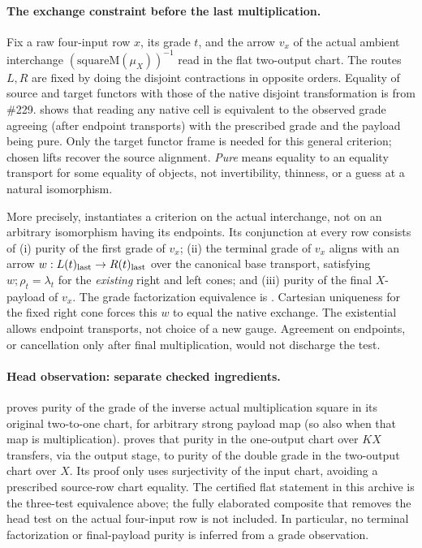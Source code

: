 \documentclass[10pt]{article}
\begin{document}
\paragraph{The exchange constraint before the last multiplication.}
Fix a raw four-input row $x$, its grade $t$, and the arrow $v_x$ of the actual ambient interchange $(\mathrm{squareM}(\mu_X))^{-1}$ read in the flat two-output chart. The routes $L,R$ are fixed by doing the disjoint contractions in opposite orders. Equality of source and target functors with those of the native disjoint transformation is from \#229.  shows that reading any native cell is equivalent to the observed grade agreeing (after endpoint transports) with the prescribed grade and the payload being pure. Only the target functor frame is needed for this general criterion; chosen lifts recover the source alignment. \emph{Pure} means equality to an equality transport for some equality of objects, not invertibility, thinness, or a guess at a natural isomorphism.
\par More precisely,  instantiates a criterion on the actual interchange, not on an arbitrary isomorphism having its endpoints. Its conjunction at every row consists of (i) purity of the first grade of $v_x$; (ii) the terminal grade of $v_x$ aligns with an arrow $w:L(t)_{\rm last}\to R(t)_{\rm last}$ over the canonical base transport, satisfying $w;\rho_t=\lambda_t$ for the \emph{existing} right and left cones; and (iii) purity of the final $X$-payload of $v_x$. The grade factorization equivalence is . Cartesian uniqueness for the fixed right cone forces this $w$ to equal the native exchange. The existential allows endpoint transports, not choice of a new gauge. Agreement on endpoints, or cancellation only after final multiplication, would not discharge the test.

\paragraph{Head observation: separate checked ingredients.}
 proves purity of the grade of the inverse actual multiplication square in its original two-to-one chart, for arbitrary strong payload map (so also when that map is multiplication).  proves that purity in the one-output chart over $KX$ transfers, via the output stage, to purity of the double grade in the two-output chart over $X$. Its proof only uses surjectivity of the input chart, avoiding a prescribed source-row chart equality. The certified flat statement in this archive is the three-test equivalence above; the fully elaborated composite that removes the head test on the actual four-input row is not included. In particular, no terminal factorization or final-payload purity is inferred from a grade observation.
\end{document}
